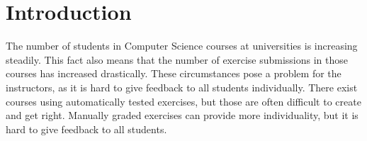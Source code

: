 
\def\proposal{Proposal for}

\usepackage[nolist]{acronym}
\usepackage{csquotes}


\setlength{\evensidemargin}{22pt}
\setlength{\oddsidemargin}{22pt}



\lstset{showspaces=false, numbers=left, frame=single, basicstyle=\small}




\fancyhead{}
\pagestyle{fancy}
\fancyhead[LE]{\slshape \leftmark}
\fancyhead[RO]{\slshape \rightmark}
\headheight=15pt

\section*{Introduction}

The number of students in Computer Science courses at universities is increasing steadily. This fact also means that the number of exercise submissions in those courses has increased drastically.
These circumstances pose a problem for the instructors, as it is hard to give feedback to all students individually. There exist courses using automatically tested exercises, but those are often difficult to create and get right. Manually graded exercises can provide more individuality, but it is hard to give feedback to all students.

